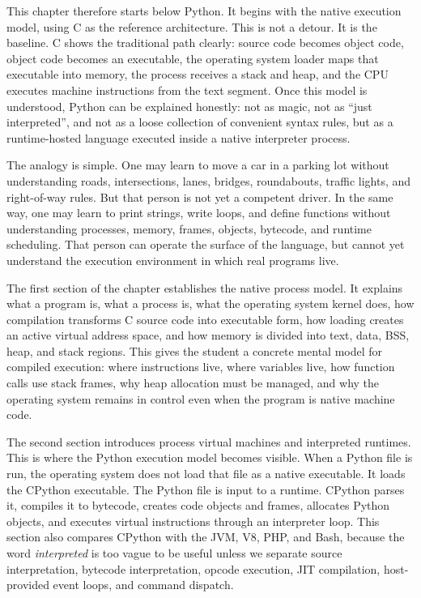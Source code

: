 \documentclass[a4paper,twoside]{report}
\begin{document}
This chapter therefore starts below Python. It begins with the native execution model, using C as the reference architecture. This is not a detour. It is the baseline. C shows the traditional path clearly: source code becomes object code, object code becomes an executable, the operating system loader maps that executable into memory, the process receives a stack and heap, and the CPU executes machine instructions from the text segment. Once this model is understood, Python can be explained honestly: not as magic, not as ``just interpreted'', and not as a loose collection of convenient syntax rules, but as a runtime-hosted language executed inside a native interpreter process.

The analogy is simple. One may learn to move a car in a parking lot without understanding roads, intersections, lanes, bridges, roundabouts, traffic lights, and right-of-way rules. But that person is not yet a competent driver. In the same way, one may learn to print strings, write loops, and define functions without understanding processes, memory, frames, objects, bytecode, and runtime scheduling. That person can operate the surface of the language, but cannot yet understand the execution environment in which real programs live.

The first section of the chapter establishes the native process model. It explains what a program is, what a process is, what the operating system kernel does, how compilation transforms C source code into executable form, how loading creates an active virtual address space, and how memory is divided into text, data, BSS, heap, and stack regions. This gives the student a concrete mental model for compiled execution: where instructions live, where variables live, how function calls use stack frames, why heap allocation must be managed, and why the operating system remains in control even when the program is native machine code.

The second section introduces process virtual machines and interpreted runtimes. This is where the Python execution model becomes visible. When a Python file is run, the operating system does not load that file as a native executable. It loads the CPython executable. The Python file is input to a runtime. CPython parses it, compiles it to bytecode, creates code objects and frames, allocates Python objects, and executes virtual instructions through an interpreter loop. This section also compares CPython with the JVM, V8, PHP, and Bash, because the word \emph{interpreted} is too vague to be useful unless we separate source interpretation, bytecode interpretation, opcode execution, JIT compilation, host-provided event loops, and command dispatch.
\end{document}
